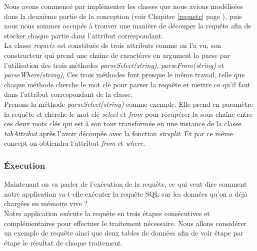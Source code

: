 \documentclass[oneside,13pt,a4paper]{report}
\begin{document}
Nous avons commencé par implémenter les classes que nous avions modélisées dans la deuxième partie de la conception (voir Chapitre \ref{requete} page \pageref{requete}), puis nous nous sommes occupés à trouver une manière de découper la requête afin de stocker chaque partie dans l'attribut correspondant.
\\
La classe \textit{requete} est constituée de trois attributs comme on l'a vu, son constructeur qui prend une chaine de caractères en argument la parse par l’utilisation des trois méthodes \textit{parseSelect(string)}, \textit{parseFrom(string)} et \textit{parseWhere(string)}, Ces trois méthodes font presque le même travail, telle que chaque méthode cherche le mot clé pour parser la requête et mettre ce qu'il faut dans l'attribut correspondant de la classe.
\\
Prenons la méthode \textit{parseSelect(string)} comme exemple. Elle prend en paramètre la requête et cherche le mot clé \textit{select} et \textit{from} pour récupérer la sous-chaîne entre ces deux mots clés qui est à son tour transformée en une instance de la classe \textit{tabAttribut} après l'avoir découpée avec la fonction  \textit{strsplit}. Et par ce même concept on obtiendra l'attribut \textit{from} et \textit{where}.

\subsubsection{Éxecution}
Maintenant on va parler de l'exécution de la requête, ce qui veut dire comment notre application va-t-elle exécuter la requête SQL sur les données qu'on a déjà chargées en mémoire vive ?
\\
Notre application exécute la requête en trois étapes consécutives et complémentaires pour effectuer le traitement nécessaire. Nous allons considérer un exemple de requête ainsi que deux tables de données afin de voir étape par étape le résultat de chaque traitement.
\end{document}
